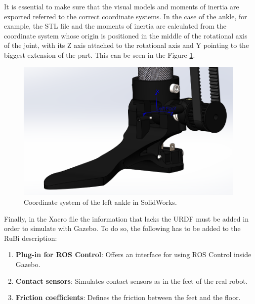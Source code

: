 It is essential to make sure that the visual models and moments of inertia are exported referred to the correct coordinate systems.
In the case of the ankle, for example, the STL file and the moments of inertia are calculated from the coordinate system whose origin is positioned in the middle of the rotational axis of the joint, with its Z axis attached to the rotational axis and Y pointing to the biggest extension of the part.
This can be seen in the Figure \ref{fig:solidworks_ankle_coodinate_system}.

\begin{figure}[ht!]
  \centering
  \includegraphics[width=0.75\linewidth]{figures/solidworks_ankle_coordinate_system}
  \caption{Coordinate system of the left ankle in SolidWorks.}
  \label{fig:solidworks_ankle_coodinate_system}
\end{figure}

Finally, in the Xacro file the information that lacks the URDF must be added in order to simulate with Gazebo.
To do so, the following has to be added to the RuBi description:
\begin{enumerate}
  \item \textbf{Plug-in for ROS Control}: Offers an interface for using ROS Control inside Gazebo.
  \item \textbf{Contact sensors}: Simulates contact sensors as in the feet of the real robot.
  \item \textbf{Friction coefficients}: Defines the friction between the feet and the floor.
\end{enumerate}

